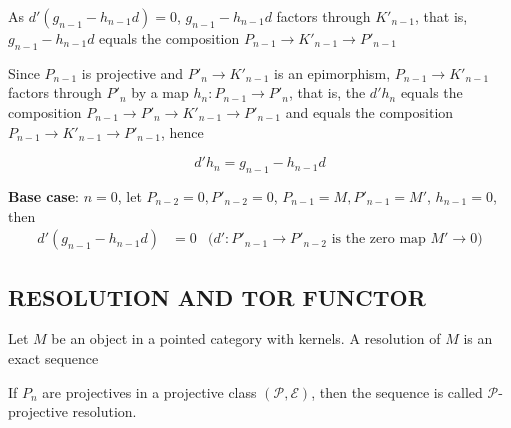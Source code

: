 \documentclass{article}
\begin{document}
\begin{longproof}
\begin{enumerate}
        \begin{center}
        \end{center}

        As $d'(g_{n-1} - h_{n-1} d) = 0$, $g_{n-1} - h_{n-1} d$ factors through $K'_{n-1}$, that is, $g_{n-1} - h_{n-1} d$ equals the composition $P_{n-1} \to K'_{n-1} \to P'_{n-1}$

        Since $P_{n-1}$ is projective and $P'_n \to K'_{n-1}$ is an epimorphism, $P_{n-1} \to K'_{n-1}$ factors through $P'_n$ by a map $h_n: P_{n-1} \to P'_n$, that is, the $d' h_n$ equals the composition $P_{n-1} \to P'_n \to K'_{n-1} \to P'_{n-1}$ and equals the composition $P_{n-1} \to K'_{n-1} \to P'_{n-1}$, hence

        $$
            d' h_n = g_{n-1} - h_{n-1} d
        $$

        \textbf{Base case}: $n=0$, let $P_{n-2} = 0, P'_{n-2} = 0$, $P_{n-1} = M, P'_{n-1} = M'$, $h_{n-1} = 0$, then 
        \begin{align*}
            d'(g_{n-1} - h_{n-1} d) 
            &= 0 &\text{($d': P'_{n-1} \to P'_{n-2}$ is the zero map $M' \to 0$)}
        \end{align*}
        
    \end{enumerate}
\end{longproof}

\subsection{RESOLUTION AND TOR FUNCTOR}

\begin{definition}
    Let $M$ be an object in a pointed category with kernels. A resolution of $M$ is an exact sequence
    \begin{center}
    \end{center}

    If $P_n$ are projectives in a projective class $(\mathcal{P}, \mathcal{E})$, then the sequence is called $\mathcal{P}$-projective resolution.
\end{definition}
\end{document}
